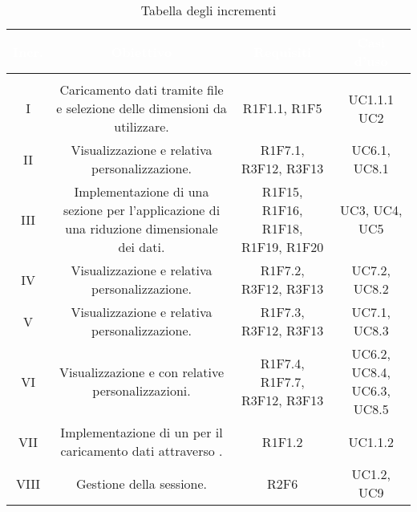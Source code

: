 \newpage
{
\setlength\arrayrulewidth{1pt}
\setlength\colA{1.5cm}
\setlength\colB{8cm}
\setlength\colC{4cm}
\setlength\colD{2cm}
\setlength\total{\dimexpr\colA+\colB+\colC+\colD+6\tabcolsep\relax}
\begin{longtable}{C{\colA} | C{\colB} | C{\colC} | C{\colD}}
		\textcolor{white}{\textbf{Incr.}} & 
		\textcolor{white}{\textbf{Obiettivo}} & 
		\textcolor{white}{\textbf{Requisiti}} & 
		\textcolor{white}{\textbf{Casi d'uso}} \\
		\endfirsthead
	    \\
	    \endfoot
	    \caption{Tabella degli incrementi}
	    \endlastfoot

I &
Caricamento dati tramite file e selezione delle dimensioni da utilizzare.& 
R1F1.1, R1F5 & 
UC1.1.1 \newline UC2\\
II &
Visualizzazione  e relativa personalizzazione.& 
R1F7.1, R3F12, R3F13 & 
UC6.1, UC8.1\\
III & 
Implementazione di una sezione per l'applicazione di una riduzione dimensionale dei dati. & 
R1F15, R1F16, R1F18, R1F19, R1F20 &
UC3, UC4, UC5\\
IV & 
Visualizzazione  e relativa personalizzazione. & 
R1F7.2, R3F12, R3F13 & 
UC7.2, UC8.2\\
V & 
Visualizzazione  e relativa personalizzazione. & 
R1F7.3, R3F12, R3F13& 
UC7.1, UC8.3\\
VI & 
Visualizzazione  e  con relative personalizzazioni. & 
R1F7.4, R1F7.7, R3F12, R3F13& 
UC6.2, UC8.4, UC6.3, UC8.5\\
VII & 
Implementazione di un  per il caricamento dati attraverso . & 
R1F1.2 & 
UC1.1.2\\

VIII & 
Gestione della sessione. & 
R2F6 & 
UC1.2, UC9\\


\end{longtable}
}